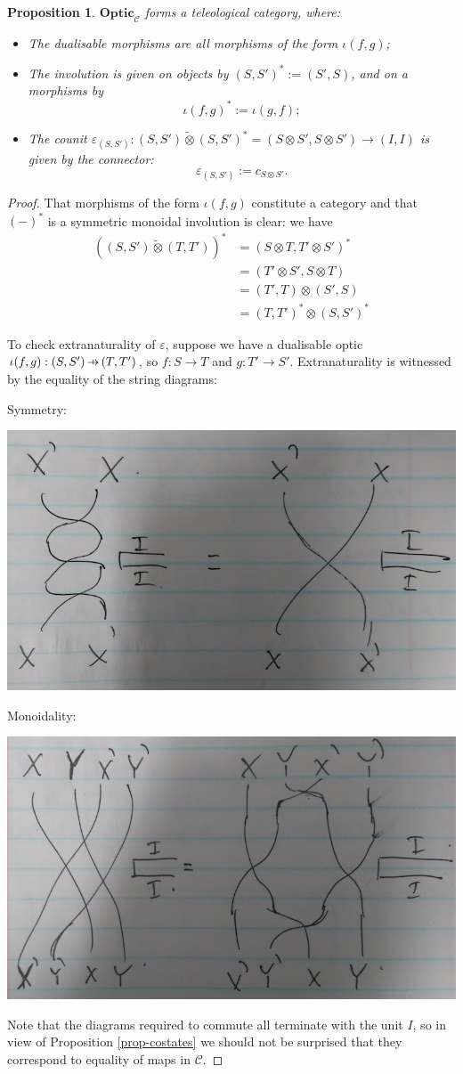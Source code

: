 \documentclass[11pt,a4paper]{article}
\theoremstyle{plain}
\newtheorem{proposition}[theorem]{Proposition}
\theoremstyle{definition}
\newcommand{\C}{\mathscr{C}}
\newcommand{\Optic}{\mathbf{Optic}}
\newcommand{\switched}{\mathbin{\tilde{\otimes}}}
\newcommand{\hto}{\ensuremath{\,\mathaccent\shortmid\rightarrow\,}}
\begin{document}
\begin{proposition}
$\Optic_\C$ forms a teleological category, where:
\begin{itemize}
\item The dualisable morphisms are all morphisms of the form $\iota(f, g)$;
\item The involution is given on objects by $(S, S')^* := (S', S)$, and on a morphisms by \[\iota(f, g)^* := \iota(g, f);\]
\item The counit $\varepsilon_{(S, S')} : (S, S') \switched (S, S')^* = (S \otimes S', S \otimes S') \to (I, I)$ is given by the connector: \[\varepsilon_{(S, S')} := c_{S \otimes S'}.\]
\end{itemize}
\end{proposition}
\begin{proof}
That morphisms of the form $\iota(f, g)$ constitute a category and that $(-)^*$ is a symmetric monoidal involution is clear: we have
\begin{align*}
\left( (S, S') \switched (T, T') \right)^* 
&= \left( S \otimes T, T' \otimes S' \right)^* \\
&= \left(T' \otimes S', S \otimes T  \right) \\
&= (T', T) \otimes (S', S) \\
&= (T, T')^* \otimes (S, S')^*
\end{align*}

To check extranaturality of $\varepsilon$, suppose we have a dualisable optic $\iota(f, g) : (S, S') \hto (T, T')$, so $f : S \to T$ and $g : T' \to S'$. Extranaturality is witnessed by the equality of the string diagrams:
\begin{center}

\qquad \raisebox{1.5cm}{$=$} \qquad 

\end{center}
Symmetry:
\begin{center}
\includegraphics[width=.4\textwidth]{diagrams/counit-symmetry}
\end{center}
Monoidality:
\begin{center}
\includegraphics[width=.4\textwidth]{diagrams/counit-monoidal}
\end{center}

Note that the diagrams required to commute all terminate with the unit $I$, so in view of Proposition \ref{prop-costates} we should not be surprised that they correspond to equality of maps in $\C$.
\end{proof}
\end{document}
